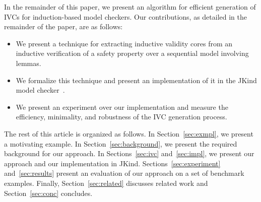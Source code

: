 In the remainder of this paper, we present an algorithm for efficient generation of IVCs for induction-based model checkers.  Our contributions, as detailed in the remainder of the paper, are as follows:

\begin{itemize}
    \item We present a technique for extracting inductive validity
      cores from an inductive verification of a safety property over a sequential model involving lemmas.
    \item We formalize this technique and present an implementation of it in the JKind model checker~\cite{jkind}.
    \item We present an experiment over our implementation and measure the efficiency, minimality, and robustness of the IVC generation process.
\end{itemize}

The rest of this article is organized as follows. In
Section~\ref{sec:exmpl}, we present a motivating example. In
Section~\ref{sec:background}, we present the required background for
our approach. In Sections~\ref{sec:ivc} and~\ref{sec:impl}, we present
our approach and our implementation in JKind.
Sections~\ref{sec:experiment} and~\ref{sec:results} present an
evaluation of our approach on a set of benchmark examples. Finally,
Section~\ref{sec:related} discusses related work and
Section~\ref{sec:conc} concludes.

